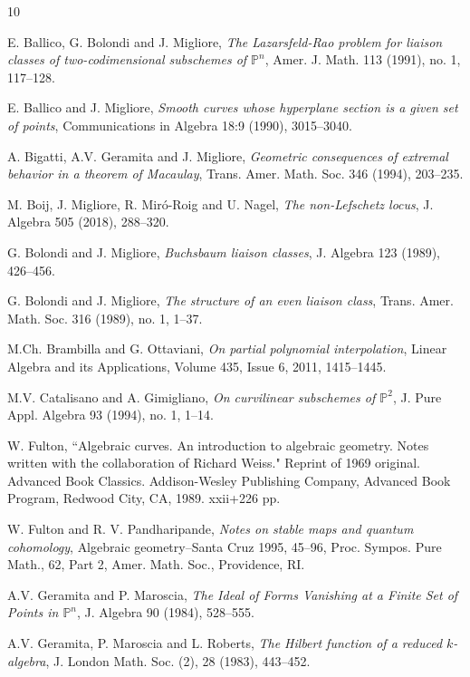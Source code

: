 \documentclass[12pt]{amsart}%
\numberwithin{equation}{section}
\theoremstyle{definition}
\numberwithin{equation}{section}
\begin{document}
\begin{thebibliography}{10}

 E. Ballico, G. Bolondi and J. Migliore, {\it The Lazarsfeld-Rao problem for liaison classes of two-codimensional subschemes of $\mathbb P^n$}, Amer. J. Math. 113 (1991), no. 1, 117–128.

 E. Ballico and J. Migliore, {\it Smooth curves whose hyperplane section is a
given set of points}, Communications in Algebra 18:9 (1990), 3015--3040.

 A. Bigatti, A.V. Geramita and J. Migliore, {\it Geometric consequences of extremal behavior in a theorem of Macaulay}, Trans. Amer. Math. Soc. 346 (1994), 203--235.

 M. Boij, J. Migliore, R. Mir\'o-Roig and U. Nagel, {\it The non-Lefschetz locus}, J. Algebra 505 (2018), 288--320.

 G. Bolondi and J. Migliore, {\it Buchsbaum liaison classes}, J. Algebra 123 (1989), 426--456.

 G. Bolondi and J. Migliore, {\it The structure of an even liaison class}, Trans. Amer. Math. Soc. 316 (1989), no. 1, 1–37.

 M.Ch. Brambilla and G. Ottaviani,
{\it On partial polynomial interpolation},
Linear Algebra and its Applications,
Volume 435, Issue 6,
2011,
1415--1445.

 M.V. Catalisano and A. Gimigliano,
{\it On curvilinear subschemes of $\mathbb P^2$},
J. Pure Appl. Algebra 93 (1994), no. 1, 1--14.


 W. Fulton, ``Algebraic curves. An introduction to algebraic geometry. Notes written with the collaboration of Richard Weiss." Reprint of 1969 original. Advanced Book Classics. Addison-Wesley Publishing Company, Advanced Book Program, Redwood City, CA, 1989. xxii+226 pp. 

 W. Fulton and R. V. Pandharipande, {\it Notes on stable maps and quantum cohomology}, {Algebraic geometry--Santa Cruz 1995}, 45--96, Proc. Sympos. Pure Math., 62, Part 2, Amer. Math. Soc., Providence, RI.

 A.V. Geramita and P. Maroscia, {\it The Ideal of Forms Vanishing at a Finite Set
of Points in $\mathbb P^n$}, J. Algebra 90 (1984), 528--555.

 A.V. Geramita, P. Maroscia and L. Roberts, {\it The Hilbert function of a reduced $k$-algebra}, J. London Math. Soc. (2), 28 (1983), 443--452.


\end{thebibliography}
\end{document}
